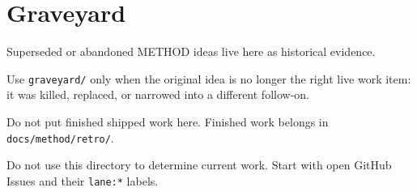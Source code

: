 \chapter{Graveyard}\label{record-385}

\smallskip

Superseded or abandoned METHOD ideas live here as historical evidence.

Use \texttt{g\allowbreak{}r\allowbreak{}a\allowbreak{}v\allowbreak{}e\allowbreak{}y\allowbreak{}a\allowbreak{}r\allowbreak{}d\allowbreak{}/} only when the original idea is no longer the right live work item: it was killed, replaced, or narrowed into a different follow-on.

Do not put finished shipped work here. Finished work belongs in \texttt{d\allowbreak{}o\allowbreak{}c\allowbreak{}s\allowbreak{}/\allowbreak{}m\allowbreak{}e\allowbreak{}t\allowbreak{}h\allowbreak{}o\allowbreak{}d\allowbreak{}/\allowbreak{}r\allowbreak{}e\allowbreak{}t\allowbreak{}r\allowbreak{}o\allowbreak{}/}.

Do not use this directory to determine current work. Start with open GitHub Issues and their \texttt{l\allowbreak{}a\allowbreak{}n\allowbreak{}e\allowbreak{}:\allowbreak{}*} labels.

